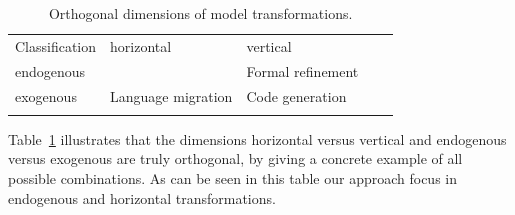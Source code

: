 \begin{table}[h]
\centering
\caption{Orthogonal dimensions of model transformations.}
\label{tab:orthogonal}
\begin{tabular}{lllll}
\cline{1-3}
\multicolumn{1}{|l|}{Classification} & \multicolumn{1}{l|}{horizontal}                                                 & \multicolumn{1}{l|}{vertical}          &  &  \\ \cline{1-3}
\multicolumn{1}{|l|}{endogenous}     & \multicolumn{1}{l|}{\cellcolor[HTML]{9B9B9B}{\color[HTML]{000000} Refactoring}} & \multicolumn{1}{l|}{Formal refinement} &  &  \\ \cline{1-3}
\multicolumn{1}{|l|}{exogenous}      & \multicolumn{1}{l|}{Language migration}                                         & \multicolumn{1}{l|}{Code generation}   &  &  \\ \cline{1-3}
                                     &                                                                                 &                                        &  & 
\end{tabular}
\end{table}

 Table~\ref{tab:orthogonal} illustrates that the dimensions horizontal versus vertical and endogenous
versus exogenous are truly orthogonal, by giving a concrete example of all
possible combinations. As can be seen in this table our approach focus in endogenous and horizontal transformations.









